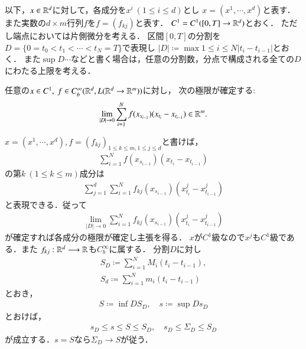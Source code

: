 以下，$x \in \mathbb{R}^d$に対して，各成分を$x^i\ (1 \leq i \leq d)$とし
$x = (x^1,\cdots,x^d)$と表す．
また実数の$d \times m$行列$f$を$f=(f_{kj})$と表す．
$C^1 = C^1([0,T] \rightarrow \mathbb{R}^d)$とおく．
ただし端点においては片側微分を考える．
区間$[0,T]$の分割を
$D = \{0 = t_0 < t_1 < \cdots < t_N = T\}$で表現し
$|D| \coloneqq \max{1 \leq i \leq N}{\left| t_i - t_{i-1} \right|}$とおく．
また$\sup{D}{\cdots}$などと書く場合は，任意の分割数，分点で構成される全ての$D$にわたる上限を考える．

\begin{screen}
	\begin{thm}
		任意の$x \in C^1,\ f \in C_b^\infty(\mathbb{R}^d,L(\mathbb{R}^d \rightarrow \mathbb{R}^m))$に対し，
		次の極限が確定する:
		\begin{align}
			\lim_{|D| \to 0}
			\sum_{i=1}^{N} f(x_{s_{i-1}})(x_{t_i} - x_{t_{i-1}})
			\in \mathbb{R}^m.
		\end{align}
	\end{thm}
\end{screen}

\begin{prf}
	$x = (x^1,\cdots,x^d),
	f = (f_{kj})_{1 \leq k \leq m,1 \leq j \leq d}$と書けば，
	\begin{align}
		\sum_{i=1}^{N} f(x_{s_{i-1}})(x_{t_i} - x_{t_{i-1}})
	\end{align}
	の第$k\ (1 \leq k \leq m)$成分は
	\begin{align}
		\sum_{j=1}^{d} \sum_{i=1}^{N} f_{kj}(x_{s_{i-1}})(x^j_{t_i} - x^j_{t_{i-1}})
	\end{align}
	と表現できる．従って
	\begin{align}
		\lim_{|D| \to 0} \sum_{i=1}^{N} f_{kj}(x_{s_{i-1}})(x^j_{t_i} - x^j_{t_{i-1}})
	\end{align}
	が確定すれば各成分の極限が確定し主張を得る．
	$x$が$C^1$級なので$x^j$も$C^1$級である．また
	$f_{kj}:\mathbb{R}^d \longrightarrow \mathbb{R}$も$C_b^\infty$に属する．
	分割$D$に対し
	\begin{align}
		S_D \coloneqq \sum_{i=1}^{N} M_i(t_i - t_{i-1}), \\
		S_d \coloneqq \sum_{i=1}^{N} m_i(t_i - t_{i-1})
	\end{align}
	とおき，
	\begin{align}
		S \coloneqq \inf{D}{S_D},
		\quad s \coloneqq \sup{D}{s_D}
	\end{align}
	とおけば，
	\begin{align}
		s_D \leq s \leq S \leq S_D,
		\quad s_D \leq \Sigma_D \leq S_D
	\end{align}
	が成立する．$s = S$なら$\Sigma_D \longrightarrow S$が従う．
\end{prf}

